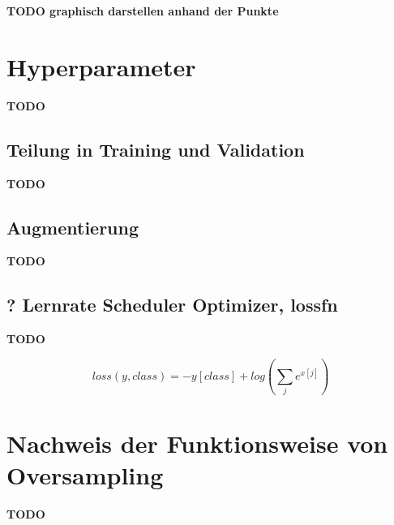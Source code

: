 \textbf{TODO graphisch darstellen anhand der Punkte}


\clearpage
\section{Hyperparameter}\label{hyper}
\textbf{TODO}

\subsection{Teilung in Training und Validation}\label{split}
\textbf{TODO}

\subsection{Augmentierung}\label{augmentation}
\textbf{TODO}

\subsection{? Lernrate Scheduler Optimizer, lossfn}\label{lrate}
\textbf{TODO}

\begin{equation}
 loss(y, class) = - y[class] + log( \sum_{j}^{} e^{x[j]} )
\end{equation}

\section{Nachweis der Funktionsweise von Oversampling}\label{oversampling}
\textbf{TODO}


